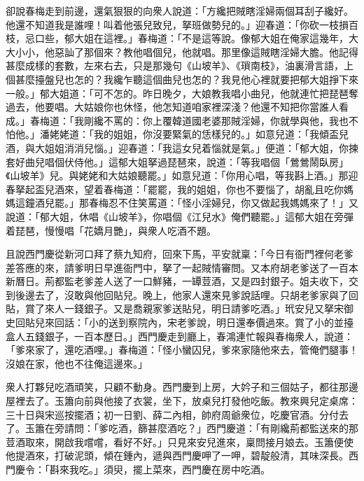 卻說春梅走到前邊，還氣狠狠的向衆人說道：「方纔把賊瞎淫婦兩個耳刮子纔好。他還不知道我是誰哩！叫着他張兒致兒，拏班做勢兒的。」迎春道：「你砍一枝損百枝，{}忌口些，郁大姐在這裡。」春梅道：「不是這等說。像郁大姐在俺家這幾年，大大小小，他惡訕了那個來？教他唱個兒，他就唱。那里像這賊瞎淫婦大膽。他記得甚麼成樣的套數，左來右去，只是那幾句《山坡羊》、《瑣南枝》，油裏滑言語，上個甚麼擡盤兒也怎的？我纔乍聽這個曲兒也怎的？我見他心裡就要把郁大姐掙下來一般。」郁大姐道：「可不怎的。昨日晚夕，大娘教我唱小曲兒，他就連忙把琵琶奪過去，他要唱。大姑娘你也休怪，他怎知道咱家裡深淺？他還不知把你當誰人看成。」春梅道：「我剛纔不罵的：你上覆韓道國老婆那賊淫婦，你就學與他，我也不怕他。」潘姥姥道：「我的姐姐，你沒要緊氣的恁樣兒的。」{}如意兒道：「我傾盃兒酒，與大姐姐消消兒惱。」迎春道：「我這女兒着惱就是氣。」便道：「郁大姐，你揀套好曲兒唱個伏侍他。」這郁大姐拏過琵琶來，說道：「等我唱個「鶯鶯鬧臥房」《山坡羊》兒。與姥姥和大姑娘聽罷。」如意兒道：「你用心唱，等我斟上酒。」那迎春拏起盃兒酒來，望着春梅道：「罷罷，我的姐姐，你也不要惱了，胡亂且吃你媽媽這鐘酒兒罷。」那春梅忍不住笑罵道：「怪小淫婦兒，你又做起我媽媽來了！」{}又說道：「郁大姐，休唱《山坡羊》，你唱個《江兒水》俺們聽罷。」這郁大姐在旁彈着琵琶，慢慢唱「花嬌月艷」，與衆人吃酒不題。

且說西門慶從新河口拜了蔡九知府，回來下馬，平安就稟：「今日有衙門裡何老爹差答應的來，請爹明日早進衙門中，拏了一起賊情審問。又本府胡老爹送了一百本新曆日。荊都監老爹差人送了一口鮮豬，一罈荳酒，又是四封銀子。姐夫收下，交到後邊去了，沒敢與他回貼兒。晚上，他家人還來見爹說話哩。只胡老爹家與了回貼，賞了來人一錢銀子。又是喬親家爹送貼兒，明日請爹吃酒。」玳安兒又拏宋御史回貼兒來回話：「小的送到察院內，宋老爹說，明日還奉價過來。賞了小的並擡盒人五錢銀子，一百本歷日。」西門慶走到廳上，春鴻連忙報與春梅衆人，說道：「爹來家了，還吃酒哩。」春梅道：「怪小蠻囚兒，爹來家隨他來去，管俺們腿事！沒娘在家，他也不往俺這邊來。」

衆人打夥兒吃酒頑笑，只顧不動身。西門慶到上房，大妗子和三個姑子，都往那邊屋裡去了。玉簫向前與他接了衣裳，坐下，放桌兒打發他吃飯。教來興兒定桌席：三十日與宋巡按擺酒；初一日劉、薛二內相，帥府周爺衆位，吃慶官酒。分付去了。玉簫在旁請問：「爹吃酒，篩甚麼酒吃？」西門慶道：「有剛纔荊都監送來的那荳酒取來，開啟我嚐嚐，看好不好。」只見來安兒進來，稟問接月娘去。玉簫便使他提酒來，打破泥頭，傾在鍾內，遞與西門慶呷了一呷，碧靛般清，其味深長。西門慶令：「斟來我吃。」須臾，擺上菜來，西門慶在房中吃酒。

